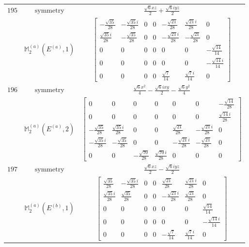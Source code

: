 \documentclass[fleqn,8pt,landscape]{jsarticle}
\begin{document}
\begin{longtable}{ccc}
$ 195 $ & $ \text{symmetry} $ & $ \frac{\sqrt{6} x z}{2} + \frac{\sqrt{6} i y z}{2} $ \\
$  $ & $ \mathbb{M}_{2}^{(a)}(E^{(a)},1) $ & $ \begin{bmatrix} - \frac{\sqrt{35}}{28} & - \frac{\sqrt{35} i}{28} & 0 & 0 & - \frac{\sqrt{21}}{28} & \frac{\sqrt{21} i}{28} & 0 \\ \frac{\sqrt{35} i}{28} & - \frac{\sqrt{35}}{28} & 0 & 0 & - \frac{\sqrt{21} i}{28} & - \frac{\sqrt{21}}{28} & 0 \\ 0 & 0 & 0 & 0 & 0 & 0 & - \frac{\sqrt{14}}{14} \\ 0 & 0 & 0 & 0 & 0 & 0 & - \frac{\sqrt{14} i}{14} \\ 0 & 0 & 0 & 0 & \frac{\sqrt{7}}{14} & \frac{\sqrt{7} i}{14} & 0 \end{bmatrix} $ \\ \hline
$ 196 $ & $ \text{symmetry} $ & $ \frac{\sqrt{6} x^{2}}{4} - \frac{\sqrt{6} i x y}{2} - \frac{\sqrt{6} y^{2}}{4} $ \\
$  $ & $ \mathbb{M}_{2}^{(a)}(E^{(a)},2) $ & $ \begin{bmatrix} 0 & 0 & 0 & 0 & 0 & 0 & - \frac{\sqrt{14}}{28} \\ 0 & 0 & 0 & 0 & 0 & 0 & \frac{\sqrt{14} i}{28} \\ - \frac{\sqrt{35}}{28} & \frac{\sqrt{35} i}{28} & 0 & 0 & \frac{\sqrt{21}}{28} & - \frac{\sqrt{21} i}{28} & 0 \\ - \frac{\sqrt{35} i}{28} & - \frac{\sqrt{35}}{28} & 0 & 0 & - \frac{\sqrt{21} i}{28} & - \frac{\sqrt{21}}{28} & 0 \\ 0 & 0 & - \frac{\sqrt{70}}{28} & \frac{\sqrt{70} i}{28} & 0 & 0 & 0 \end{bmatrix} $ \\ \hline
$ 197 $ & $ \text{symmetry} $ & $ \frac{\sqrt{6} x z}{2} - \frac{\sqrt{6} i y z}{2} $ \\
$  $ & $ \mathbb{M}_{2}^{(a)}(E^{(b)},1) $ & $ \begin{bmatrix} \frac{\sqrt{35}}{28} & - \frac{\sqrt{35} i}{28} & 0 & 0 & \frac{\sqrt{21}}{28} & \frac{\sqrt{21} i}{28} & 0 \\ \frac{\sqrt{35} i}{28} & \frac{\sqrt{35}}{28} & 0 & 0 & - \frac{\sqrt{21} i}{28} & \frac{\sqrt{21}}{28} & 0 \\ 0 & 0 & 0 & 0 & 0 & 0 & \frac{\sqrt{14}}{14} \\ 0 & 0 & 0 & 0 & 0 & 0 & - \frac{\sqrt{14} i}{14} \\ 0 & 0 & 0 & 0 & - \frac{\sqrt{7}}{14} & \frac{\sqrt{7} i}{14} & 0 \end{bmatrix} $ \\ \hline

\end{longtable}
\end{document}
